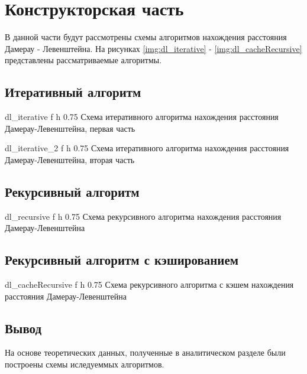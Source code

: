 \chapter{Конструкторская часть}

В данной части будут рассмотрены схемы алгоритмов нахождения расстояния Дамерау - Левенштейна.
На рисунках \ref{img:dl_iterative} - \ref{img:dl_cacheRecursive} представлены рассматриваемые алгоритмы.

\section{Итеративный алгоритм}
{dl_iterative} %
{f} %
{h} %
{0.75\textwidth} %
{Схема итеративного алгоритма нахождения расстояния Дамерау-Левенштейна, первая часть} %
\clearpage

{dl_iterative_2} %
{f} %
{h} %
{0.75\textwidth} %
{Схема итеративного алгоритма нахождения расстояния Дамерау-Левенштейна, вторая часть} %
\clearpage

\section{Рекурсивный алгоритм}
{dl_recursive} %
{f} %
{h} %
{0.75\textwidth} %
{Схема рекурсивного алгоритма нахождения расстояния Дамерау-Левенштейна} %
\clearpage

\section{Рекурсивный алгоритм с кэшированием}
{dl_cacheRecursive} %
{f} %
{h} %
{0.75\textwidth} %
{Схема рекурсивного алгоритма с кэшем нахождения расстояния Дамерау-Левенштейна} %
\clearpage

\section*{Вывод}
На основе теоретических данных, полученные в аналитическом разделе были построены схемы иследуеммых  алгоритмов.

